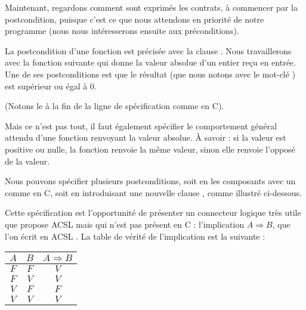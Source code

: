 Maintenant, regardons comment sont exprimés les contrats, à commencer par la
postcondition, puisque c'est ce que nous attendons en priorité de notre
programme (nous nous intéresserons ensuite aux préconditions).





La postcondition d'une fonction est précisée avec la clause .
Nous travaillerons avec la fonction suivante qui donne la valeur absolue
d'un entier reçu en entrée.
Une de ses postconditions est que le résultat (que nous notons avec le
mot-clé ) est supérieur ou égal à 0.






(Notons le \CodeInline{;} à la fin de la ligne de spécification comme en C).



Mais ce n'est pas tout, il faut également spécifier le comportement général
attendu d'une fonction renvoyant la valeur absolue. À savoir : si la valeur
est positive ou nulle, la fonction renvoie la même valeur, sinon elle renvoie
l'opposé de la valeur.



Nous pouvons spécifier plusieurs postconditions, soit en les composants avec
un \CodeInline{\&\&} comme en C, soit en introduisant une nouvelle clause ,
comme illustré ci-dessous.






Cette spécification est l'opportunité de présenter un connecteur logique
très utile que propose ACSL mais qui n'est pas présent en C :
l'implication $A \Rightarrow B$, que l'on écrit en ACSL .
La table de vérité de l'implication est la suivante :



\begin{longtabu}{|c|c|c|} \hline
$A$ & $B$ & $A \Rightarrow B$ \\ \hline
$F$ & $F$ & $V$ \\ \hline
$F$ & $V$ & $V$ \\ \hline
$V$ & $F$ & $F$ \\ \hline
$V$ & $V$ & $V$ \\ \hline
\end{longtabu}



